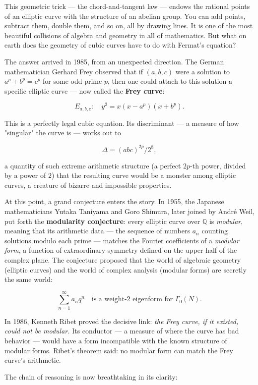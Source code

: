 \documentclass[12pt, letterpaper, openany]{book}
\theoremstyle{definition}
\theoremstyle{remark}
\begin{document}
This geometric trick --- the chord-and-tangent law --- endows the rational points of an elliptic curve with the structure of an abelian group. You can add points, subtract them, double them, and so on, all by drawing lines. It is one of the most beautiful collisions of algebra and geometry in all of mathematics. But what on earth does the geometry of cubic curves have to do with Fermat's equation?

The answer arrived in 1985, from an unexpected direction. The German mathematician Gerhard Frey observed that if $(a, b, c)$ were a solution to $a^p + b^p = c^p$ for some odd prime $p$, then one could attach to this solution a specific elliptic curve --- now called the \textbf{Frey curve}:

\[
E_{a,b,c} : \quad y^2 = x(x - a^p)(x + b^p).
\]

This is a perfectly legal cubic equation. Its discriminant --- a measure of how "singular" the curve is --- works out to

\[
\Delta = (abc)^{2p} / 2^8,
\]

a quantity of such extreme arithmetic structure (a perfect $2p$-th power, divided by a power of $2$) that the resulting curve would be a monster among elliptic curves, a creature of bizarre and impossible properties.

At this point, a grand conjecture enters the story. In 1955, the Japanese mathematicians Yutaka Taniyama and Goro Shimura, later joined by Andr\'e Weil, put forth the \textbf{modularity conjecture}: every elliptic curve over $\mathbb{Q}$ is \textit{modular}, meaning that its arithmetic data --- the sequence of numbers $a_n$ counting solutions modulo each prime --- matches the Fourier coefficients of a \textit{modular form}, a function of extraordinary symmetry defined on the upper half of the complex plane. The conjecture proposed that the world of algebraic geometry (elliptic curves) and the world of complex analysis (modular forms) are secretly the same world:

\[
\sum_{n=1}^{\infty} a_n q^n \quad \text{is a weight-2 eigenform for } \Gamma_0(N).
\]

In 1986, Kenneth Ribet proved the decisive link: \textit{the Frey curve, if it existed, could not be modular.} Its conductor --- a measure of where the curve has bad behavior --- would have a form incompatible with the known structure of modular forms. Ribet's theorem said: no modular form can match the Frey curve's arithmetic.

The chain of reasoning is now breathtaking in its clarity:
\end{document}
